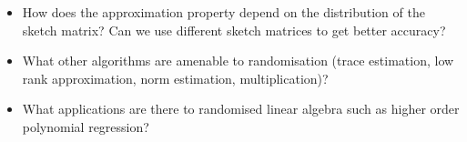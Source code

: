 \begin{itemize}
\item[1. ] How does the approximation property depend on the distribution of the sketch matrix? Can we use different sketch matrices to get better accuracy?


\item[2. ] What other algorithms are amenable to randomisation (trace estimation, low rank approximation, norm estimation, multiplication)?


\item[3. ] What applications are there to randomised linear algebra such as higher order polynomial regression?

\end{itemize}

